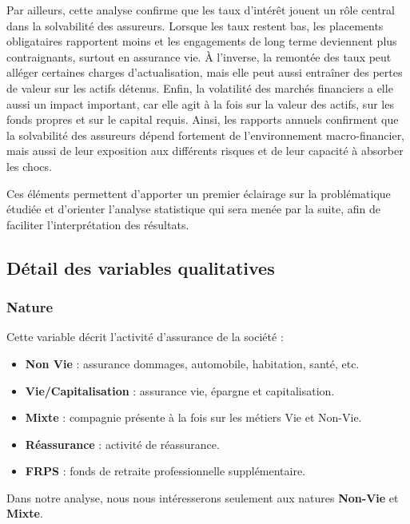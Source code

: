 \documentclass[
]{article}
\providecommand{\tightlist}{%
  \setlength{\itemsep}{0pt}\setlength{\parskip}{0pt}}
\begin{document}
Par ailleurs, cette analyse confirme que les taux d'intérêt jouent un
rôle central dans la solvabilité des assureurs. Lorsque les taux restent
bas, les placements obligataires rapportent moins et les engagements de
long terme deviennent plus contraignants, surtout en assurance vie. À
l'inverse, la remontée des taux peut alléger certaines charges
d'actualisation, mais elle peut aussi entraîner des pertes de valeur sur
les actifs détenus. Enfin, la volatilité des marchés financiers a elle
aussi un impact important, car elle agit à la fois sur la valeur des
actifs, sur les fonds propres et sur le capital requis. Ainsi, les
rapports annuels confirment que la solvabilité des assureurs dépend
fortement de l'environnement macro-financier, mais aussi de leur
exposition aux différents risques et de leur capacité à absorber les
chocs.

Ces éléments permettent d'apporter un premier éclairage sur la
problématique étudiée et d'orienter l'analyse statistique qui sera menée
par la suite, afin de faciliter l'interprétation des résultats.

\subsection{Détail des variables
qualitatives}\label{duxe9tail-des-variables-qualitatives}

\subsubsection{Nature}\label{nature}

Cette variable décrit l'activité d'assurance de la société :

\begin{itemize}
\tightlist
\item
  \textbf{Non Vie} : assurance dommages, automobile, habitation, santé,
  etc.
\item
  \textbf{Vie/Capitalisation} : assurance vie, épargne et
  capitalisation.
\item
  \textbf{Mixte} : compagnie présente à la fois sur les métiers Vie et
  Non-Vie.
\item
  \textbf{Réassurance} : activité de réassurance.
\item
  \textbf{FRPS} : fonds de retraite professionnelle supplémentaire.
\end{itemize}

Dans notre analyse, nous nous intéresserons seulement aux natures
\textbf{Non-Vie} et \textbf{Mixte}.
\end{document}

